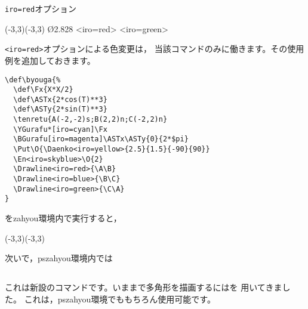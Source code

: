 \documentclass[a4j]{jarticle}
\begin{document}
\begin{showEx}{\texttt{iro=red}オプション}
\begin{zahyou}[ul=8mm]
    (-3,3)(-3,3)
\kuromaru{\A;\B;\C}
\En\O{2.828}
\Drawline<iro=red>{\A\B}
\Drawline<iro=green>{\B\C}
\end{zahyou}
\end{showEx}

\verb+<iro=red>+オプションによる色変更は，
当該コマンドのみに働きます。その使用例を追加しておきます。

\begin{jquote}
\begin{verbatim}
\def\byouga{%
  \def\Fx{X*X/2}
  \def\ASTx{2*cos(T)**3}
  \def\ASTy{2*sin(T)**3}
  \tenretu{A(-2,-2)s;B(2,2)n;C(-2,2)n}
  \YGurafu*[iro=cyan]\Fx
  \BGurafu[iro=magenta]\ASTx\ASTy{0}{2*$pi}
  \Put\O{\Daenko<iro=yellow>{2.5}{1.5}{-90}{90}}
  \En<iro=skyblue>\O{2}
  \Drawline<iro=red>{\A\B}
  \Drawline<iro=blue>{\B\C}
  \Drawline<iro=green>{\C\A}
}
\end{verbatim}
\end{jquote}

を\textsf{zahyou}環境内で実行すると，

\begin{center}
\begin{zahyou}[ul=10mm](-3,3)(-3,3)%
\byouga
\end{zahyou}
\end{center}

次いで，\textsf{pszahyou}環境内では

\begin{center}
\end{center}
\egroup

\subsection{\texorpdfstring{}{Takakkei}}
これは新設のコマンドです。いままで多角形を描画するにはを
用いてきました。
これは，\textsf{pszahyou}環境でももちろん使用可能です。
\end{document}
